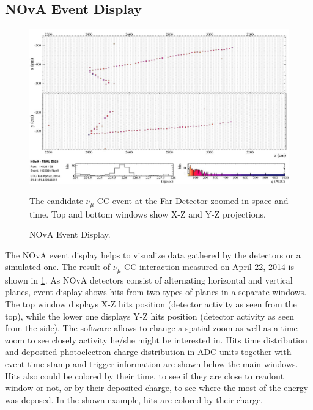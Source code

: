 \subsection{NOvA Event Display}
\begin{figure}
\includegraphics[width=1.0\textwidth]{figures/EventDisp.pdf}\\%
\caption{NOvA Event Display.}
{The candidate $\nu_\mu$ CC event at the Far Detector zoomed in space and time. Top and bottom windows show
X-Z and Y-Z projections.} \label{fig:EVD}
\end{figure}
The NOvA event display helps to visualize data gathered by the detectors or a simulated one. The result
of $\nu_\mu$ CC interaction measured on April 22, 2014 is shown in \ref{fig:EVD}. As NOvA detectors consist of 
alternating horizontal and vertical planes, event display shows hits from two types of planes in a separate 
windows. The top window displays X-Z hits position (detector activity as seen from the top), while the lower 
one displays Y-Z hits position (detector activity as seen from the side). The software allows to change a spatial zoom as well as a time zoom to see closely activity he/she might be interested in. Hits time distribution and 
deposited photoelectron charge distribution in ADC units together with event time stamp and trigger information 
are shown below the main windows. Hits also could be colored by their time, to see if they are close to readout 
window or not, or by their deposited charge, to see where the most of the energy was deposed. In the shown 
example, hits are colored by their charge.
